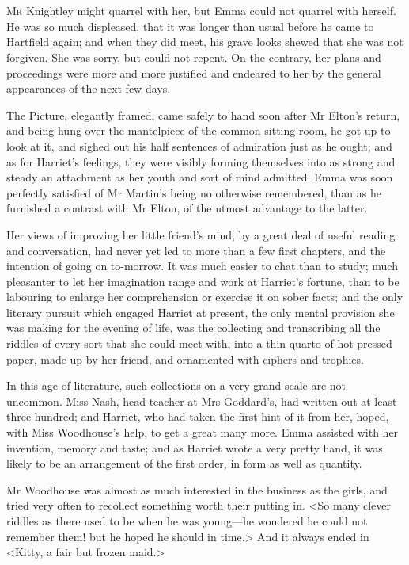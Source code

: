 \chapter[Chapter \thechapter]{}
\lettrine[lraise=0.3]{M}{r} Knightley might quarrel with her, but Emma could not quarrel with herself. He was so much displeased, that it was longer than usual before he came to Hartfield again; and when they did meet, his grave looks shewed that she was not forgiven. She was sorry, but could not repent. On the contrary, her plans and proceedings were more and more justified and endeared to her by the general appearances of the next few days.

The Picture, elegantly framed, came safely to hand soon after Mr Elton's return, and being hung over the mantelpiece of the common sitting-room, he got up to look at it, and sighed out his half sentences of admiration just as he ought; and as for Harriet's feelings, they were visibly forming themselves into as strong and steady an attachment as her youth and sort of mind admitted. Emma was soon perfectly satisfied of Mr Martin's being no otherwise remembered, than as he furnished a contrast with Mr Elton, of the utmost advantage to the latter.

Her views of improving her little friend's mind, by a great deal of useful reading and conversation, had never yet led to more than a few first chapters, and the intention of going on to-morrow. It was much easier to chat than to study; much pleasanter to let her imagination range and work at Harriet's fortune, than to be labouring to enlarge her comprehension or exercise it on sober facts; and the only literary pursuit which engaged Harriet at present, the only mental provision she was making for the evening of life, was the collecting and transcribing all the riddles of every sort that she could meet with, into a thin quarto of hot-pressed paper, made up by her friend, and ornamented with ciphers and trophies.

In this age of literature, such collections on a very grand scale are not uncommon. Miss Nash, head-teacher at Mrs Goddard's, had written out at least three hundred; and Harriet, who had taken the first hint of it from her, hoped, with Miss Woodhouse's help, to get a great many more. Emma assisted with her invention, memory and taste; and as Harriet wrote a very pretty hand, it was likely to be an arrangement of the first order, in form as well as quantity.

Mr Woodhouse was almost as much interested in the business as the girls, and tried very often to recollect something worth their putting in. <So many clever riddles as there used to be when he was young—he wondered he could not remember them! but he hoped he should in time.> And it always ended in <Kitty, a fair but frozen maid.>

